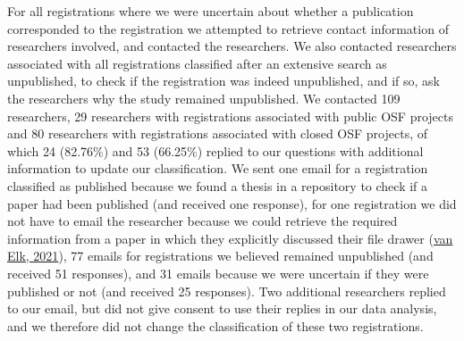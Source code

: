 \documentclass[
  ,jou, a4paper,floatsintext]{apa6}
\begin{document}
For all registrations where we were uncertain about whether a publication corresponded to the registration we attempted to retrieve contact information of researchers involved, and contacted the researchers. We also contacted researchers associated with all registrations classified after an extensive search as unpublished, to check if the registration was indeed unpublished, and if so, ask the researchers why the study remained unpublished. We contacted 109 researchers, 29 researchers with registrations associated with public OSF projects and 80 researchers with registrations associated with closed OSF projects, of which 24 (82.76\%) and 53 (66.25\%) replied to our questions with additional information to update our classification. We sent one email for a registration classified as published because we found a thesis in a repository to check if a paper had been published (and received one response), for one registration we did not have to email the researcher because we could retrieve the required information from a paper in which they explicitly discussed their file drawer (\protect\hyperlink{ref-van_elk_whats_2021}{van Elk, 2021}), 77 emails for registrations we believed remained unpublished (and received 51 responses), and 31 emails because we were uncertain if they were published or not (and received 25 responses). Two additional researchers replied to our email, but did not give consent to use their replies in our data analysis, and we therefore did not change the classification of these two registrations.
\end{document}
